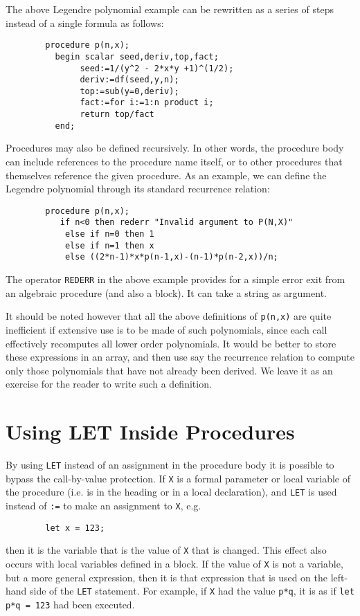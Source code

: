 The above Legendre polynomial example can be rewritten as a series of steps
instead of a single formula as follows:
\begin{verbatim}
        procedure p(n,x);
          begin scalar seed,deriv,top,fact;
               seed:=1/(y^2 - 2*x*y +1)^(1/2);
               deriv:=df(seed,y,n);
               top:=sub(y=0,deriv);
               fact:=for i:=1:n product i;
               return top/fact
          end;
\end{verbatim}
Procedures may also be defined recursively.  In other words, the procedure
body can include references to the procedure name
itself, or to other procedures that themselves reference the given
procedure.  As an example, we can define the Legendre polynomial through
its standard recurrence relation:
\begin{verbatim}
        procedure p(n,x);
           if n<0 then rederr "Invalid argument to P(N,X)"
            else if n=0 then 1
            else if n=1 then x
            else ((2*n-1)*x*p(n-1,x)-(n-1)*p(n-2,x))/n;
\end{verbatim}

\hypertarget{operator:REDERR}{}
The operator {\tt REDERR} in the above example provides
for a simple error exit from an algebraic procedure (and also a block).
It can take a string as argument.

It should be noted however that all the above definitions of {\tt p(n,x)} are
quite inefficient if extensive use is to be made of such polynomials, since
each call effectively recomputes all lower order polynomials. It would be
better to store these expressions in an array, and then use say the
recurrence relation to compute only those polynomials that have not already
been derived. We leave it as an exercise for the reader to write such a
definition.


\section{Using LET Inside Procedures}

By using {\tt LET} instead of an assignment in the procedure
body it is possible to bypass the call-by-value
 protection.  If {\tt X} is a formal parameter or local
variable of the procedure (i.e. is in the heading or in a local
declaration), and {\tt LET} is used instead of {\tt :=} to make an
assignment to {\tt X}, e.g.

\begin{verbatim}
        let x = 123;
\end{verbatim}
then it is the variable that is the value of {\tt X} that is changed.
This effect also occurs with local variables defined in a block.  If the
value of {\tt X} is not a variable, but a more general expression, then it
is that expression that is used on the left-hand side of the {\tt LET}
statement.  For example, if {\tt X} had the value {\tt p*q}, it is as if
{\tt let p*q = 123} had been executed.

